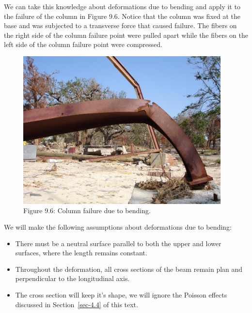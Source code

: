 \documentclass[
  letterpaper,
  DIV=11,
  numbers=noendperiod]{scrreprt}
\theoremstyle{definition}
\theoremstyle{remark}
\begin{document}
We can take this knowledge about deformations due to bending and apply
it to the failure of the column in Figure 9.6. Notice that the column
was fixed at the base and was subjected to a transverse force that
caused failure. The fibers on the right side of the column failure point
were pulled apart while the fibers on the left side of the column
failure point were compressed.

\begin{figure}[H]

{\centering \includegraphics[width=4.23958in,height=\textheight]{images/CH9 PNGs/Figure 9.6.jpg}

}

\caption{Figure 9.6: Column failure due to bending.}

\end{figure}%

We will make the following assumptions about deformations due to
bending:

\begin{itemize}
\item
  There must be a neutral surface parallel to both the upper and lower
  surfaces, where the length remains constant.
\item
  Throughout the deformation, all cross sections of the beam remain plan
  and perpendicular to the longitudinal axis.
\item
  The cross section will keep it's shape, we will ignore the Poisson
  effects discussed in Section~\ref{sec-4.4} of this text.
\end{itemize}
\end{document}
